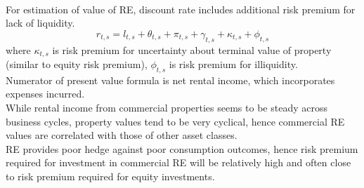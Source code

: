 \begin{remark} \\
For estimation of value of RE, discount rate includes additional risk premium for lack of liquidity.
\begin{equation}
r_{t,s} = l_{t,s} + \theta_{t,s} + \pi_{t,s} + \gamma_{t,s} + \kappa_{t,s} + \phi_{t,s} \nonumber
\end{equation}
where $\kappa_{t,s}$ is risk premium for uncertainty about terminal value of property (similar to equity risk premium), $\phi_{t,s}$ is risk premium for illiquidity.\\
Numerator of present value formula is net rental income, which incorporates expenses incurred.\\
While rental income from commercial properties seems to be steady across business cycles, property values tend to be very cyclical, hence commercial RE values are correlated with those of other asset classes.\\
RE provides poor hedge against poor consumption outcomes, hence risk premium required for investment in commercial RE will be relatively high and often close to risk premium required for equity investments.
\end{remark}